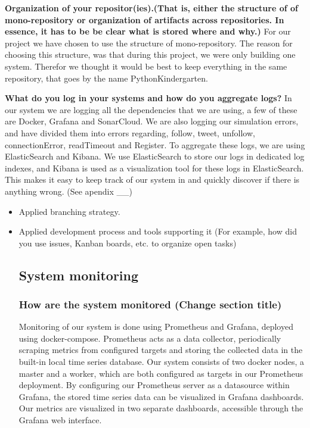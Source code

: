 \begin{itemize}
  \newline
  \textbf{Organization of your repositor(ies).(That is, either the structure of of mono-repository or organization of artifacts across repositories. In essence, it has to be be clear what is stored where and why.)} \newline
  For our project we have chosen to use the structure of mono-repository. The reason for choosing this structure, was that during this project, we were only building one system. Therefor we thought it would be best to keep everything in the same repository, that goes by the name PythonKindergarten. \newline
  
  \newline
  \textbf{What do you log in your systems and how do you aggregate logs?}  \newline
  In our system we are logging all the dependencies that we are using, a few of these are Docker, Grafana and SonarCloud. 
  We are also logging our simulation errors, and have divided them into errors regarding, follow, tweet, unfollow, connectionError, readTimeout and Register.
  To aggregate these logs, we are using ElasticSearch and Kibana. We use ElasticSearch to store our logs in dedicated log indexes, and Kibana is used as a visualization tool for these logs in ElasticSearch. This makes it easy to keep track of our system in and quickly discover if there is anything wrong. (See apendix __) \newline

  
  \begin{itemize}

  \item Applied branching strategy.
  \item Applied development process and tools supporting it (For example, how did you use issues, Kanban boards, etc. to organize open tasks)
  \subsection{System monitoring}
  \subsubsection{How are the system monitored (Change section title)}
  Monitoring of our system is done using Prometheus and Grafana, deployed using docker-compose. \newline
  Prometheus acts as a data collector, periodically scraping metrics from configured targets and storing the collected data in the built-in local time series database.\newline
  Our system consists of two docker nodes, a master and a worker, which are both configured as targets in our Prometheus deployment.\newline
  By configuring our Prometheus server as a datasource within Grafana, the stored time series data can be visualized in Grafana dashboards. Our metrics are visualized in two separate dashboards, accessible through the Grafana web interface.


\end{itemize}
\end{itemize}
